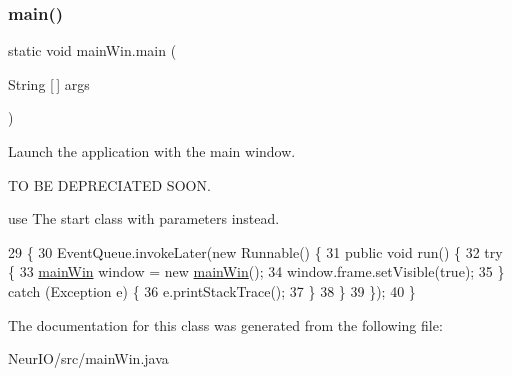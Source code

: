 \subsubsection{\texorpdfstring{main()}{main()}}
{\footnotesize\ttfamily static void main\+Win.\+main (\begin{DoxyParamCaption}\item[{String \mbox{[}$\,$\mbox{]}}]{args }\end{DoxyParamCaption})\hspace{0.3cm}{\ttfamily [static]}}

Launch the application with the main window.

TO BE D\+E\+P\+R\+E\+C\+I\+A\+T\+ED S\+O\+ON.

use The start class with parameters instead. 
\begin{DoxyCode}
29                                            \{
30         EventQueue.invokeLater(\textcolor{keyword}{new} Runnable() \{
31             \textcolor{keyword}{public} \textcolor{keywordtype}{void} run() \{
32                 \textcolor{keywordflow}{try} \{
33                     \hyperlink{classmain_win}{mainWin} window = \textcolor{keyword}{new} \hyperlink{classmain_win_a49c22fb02a4187e69d8dd16607446e16}{mainWin}();
34                     window.frame.setVisible(\textcolor{keyword}{true});
35                 \} \textcolor{keywordflow}{catch} (Exception e) \{
36                     e.printStackTrace();
37                 \}
38             \}
39         \});
40     \}
\end{DoxyCode}


The documentation for this class was generated from the following file\+:\begin{DoxyCompactItemize}
\item 
Neur\+I\+O/src/main\+Win.\+java\end{DoxyCompactItemize}
